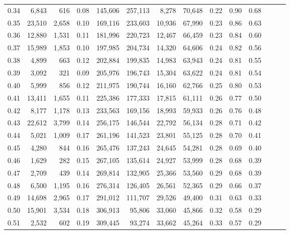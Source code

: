 \begin{tabular}{rrrrrrrrrrrrrr}
0.34 &   6,843 &    616 &  0.08 &  145,606 &  257,113 &   8,278 &  70,648 &  0.22 &  0.90 &      0.68 \\
0.35 &  23,510 &  2,658 &  0.10 &  169,116 &  233,603 &  10,936 &  67,990 &  0.23 &  0.86 &      0.63 \\
0.36 &  12,880 &  1,531 &  0.11 &  181,996 &  220,723 &  12,467 &  66,459 &  0.23 &  0.84 &      0.60 \\
0.37 &  15,989 &  1,853 &  0.10 &  197,985 &  204,734 &  14,320 &  64,606 &  0.24 &  0.82 &      0.56 \\
0.38 &   4,899 &    663 &  0.12 &  202,884 &  199,835 &  14,983 &  63,943 &  0.24 &  0.81 &      0.55 \\
0.39 &   3,092 &    321 &  0.09 &  205,976 &  196,743 &  15,304 &  63,622 &  0.24 &  0.81 &      0.54 \\
0.40 &   5,999 &    856 &  0.12 &  211,975 &  190,744 &  16,160 &  62,766 &  0.25 &  0.80 &      0.53 \\
0.41 &  13,411 &  1,655 &  0.11 &  225,386 &  177,333 &  17,815 &  61,111 &  0.26 &  0.77 &      0.50 \\
0.42 &   8,177 &  1,178 &  0.13 &  233,563 &  169,156 &  18,993 &  59,933 &  0.26 &  0.76 &      0.48 \\
0.43 &  22,612 &  3,799 &  0.14 &  256,175 &  146,544 &  22,792 &  56,134 &  0.28 &  0.71 &      0.42 \\
0.44 &   5,021 &  1,009 &  0.17 &  261,196 &  141,523 &  23,801 &  55,125 &  0.28 &  0.70 &      0.41 \\
0.45 &   4,280 &    844 &  0.16 &  265,476 &  137,243 &  24,645 &  54,281 &  0.28 &  0.69 &      0.40 \\
0.46 &   1,629 &    282 &  0.15 &  267,105 &  135,614 &  24,927 &  53,999 &  0.28 &  0.68 &      0.39 \\
0.47 &   2,709 &    439 &  0.14 &  269,814 &  132,905 &  25,366 &  53,560 &  0.29 &  0.68 &      0.39 \\
0.48 &   6,500 &  1,195 &  0.16 &  276,314 &  126,405 &  26,561 &  52,365 &  0.29 &  0.66 &      0.37 \\
0.49 &  14,698 &  2,965 &  0.17 &  291,012 &  111,707 &  29,526 &  49,400 &  0.31 &  0.63 &      0.33 \\
0.50 &  15,901 &  3,534 &  0.18 &  306,913 &   95,806 &  33,060 &  45,866 &  0.32 &  0.58 &      0.29 \\
0.51 &   2,532 &    602 &  0.19 &  309,445 &   93,274 &  33,662 &  45,264 &  0.33 &  0.57 &      0.29 \\

\end{tabular}
